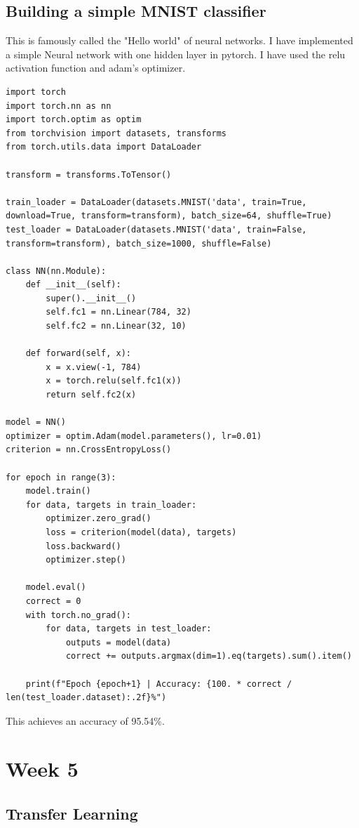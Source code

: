 \documentclass[12pt]{article}
\begin{document}
\subsection{Building a simple MNIST classifier}
This is famously called the "Hello world" of neural networks. I have implemented a simple Neural network with one hidden layer in pytorch. I have used the relu activation function and adam's optimizer.
\begin{lstlisting}
import torch
import torch.nn as nn
import torch.optim as optim
from torchvision import datasets, transforms
from torch.utils.data import DataLoader

transform = transforms.ToTensor()

train_loader = DataLoader(datasets.MNIST('data', train=True, download=True, transform=transform), batch_size=64, shuffle=True)
test_loader = DataLoader(datasets.MNIST('data', train=False, transform=transform), batch_size=1000, shuffle=False)

class NN(nn.Module):
    def __init__(self):
        super().__init__()
        self.fc1 = nn.Linear(784, 32)
        self.fc2 = nn.Linear(32, 10)

    def forward(self, x):
        x = x.view(-1, 784)
        x = torch.relu(self.fc1(x))
        return self.fc2(x)

model = NN()
optimizer = optim.Adam(model.parameters(), lr=0.01)
criterion = nn.CrossEntropyLoss()

for epoch in range(3):
    model.train()
    for data, targets in train_loader:
        optimizer.zero_grad()
        loss = criterion(model(data), targets)
        loss.backward()
        optimizer.step()
        
    model.eval()
    correct = 0
    with torch.no_grad():
        for data, targets in test_loader:
            outputs = model(data)
            correct += outputs.argmax(dim=1).eq(targets).sum().item()
            
    print(f"Epoch {epoch+1} | Accuracy: {100. * correct / len(test_loader.dataset):.2f}%")
\end{lstlisting}
This achieves an accuracy of 95.54\%. 
\section{Week 5}
\subsection{Transfer Learning}
\end{document}
